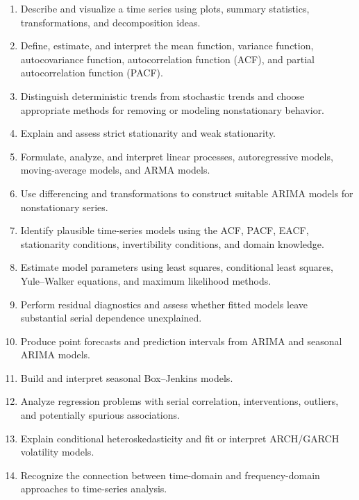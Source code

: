 \documentclass[11pt]{article}
\begin{document}
\begin{enumerate}
    \item Describe and visualize a time series using plots, summary statistics,
    transformations, and decomposition ideas.

    \item Define, estimate, and interpret the mean function, variance function,
    autocovariance function, autocorrelation function (ACF), and partial
    autocorrelation function (PACF).

    \item Distinguish deterministic trends from stochastic trends and choose
    appropriate methods for removing or modeling nonstationary behavior.

    \item Explain and assess strict stationarity and weak stationarity.

    \item Formulate, analyze, and interpret linear processes, autoregressive
    models, moving-average models, and ARMA models.

    \item Use differencing and transformations to construct suitable ARIMA
    models for nonstationary series.

    \item Identify plausible time-series models using the ACF, PACF, EACF,
    stationarity conditions, invertibility conditions, and domain knowledge.

    \item Estimate model parameters using least squares, conditional least
    squares, Yule--Walker equations, and maximum likelihood methods.

    \item Perform residual diagnostics and assess whether fitted models leave
    substantial serial dependence unexplained.

    \item Produce point forecasts and prediction intervals from ARIMA and
    seasonal ARIMA models.

    \item Build and interpret seasonal Box--Jenkins models.

    \item Analyze regression problems with serial correlation, interventions,
    outliers, and potentially spurious associations.

    \item Explain conditional heteroskedasticity and fit or interpret ARCH/GARCH
    volatility models.

    \item Recognize the connection between time-domain and frequency-domain
    approaches to time-series analysis.

\end{enumerate}
\end{document}
